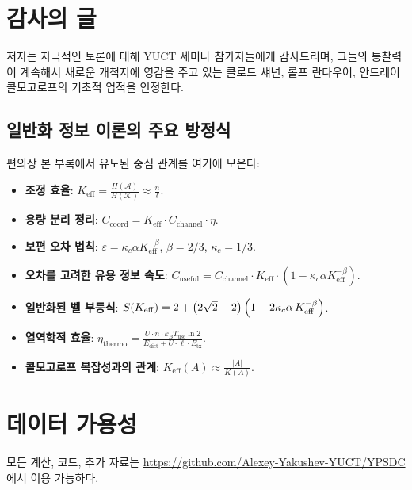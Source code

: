 \documentclass[12pt,a4paper]{article}
\newcommand{\Keff}{K_{\mathrm{eff}}}
\begin{document}
	\section*{감사의 글}
	
	저자는 자극적인 토론에 대해 YUCT 세미나 참가자들에게 감사드리며, 그들의 통찰력이 계속해서 새로운 개척지에 영감을 주고 있는 클로드 섀넌, 롤프 란다우어, 안드레이 콜모고로프의 기초적 업적을 인정한다.
	
	\subsection*{일반화 정보 이론의 주요 방정식}
	편의상 본 부록에서 유도된 중심 관계를 여기에 모은다:
	
	\begin{itemize}
		\item \textbf{조정 효율}: $\Keff = \frac{H(\mathcal{A})}{H(\mathcal{K})} \approx \frac{n}{\ell}$.
		\item \textbf{용량 분리 정리}: $C_{\text{coord}} = \Keff \cdot C_{\text{channel}} \cdot \eta$.
		\item \textbf{보편 오차 법칙}: $\varepsilon = \kappa_c \alpha K_{\mathrm{eff}}^{-\beta}$, $\beta=2/3$, $\kappa_c=1/3$.
		\item \textbf{오차를 고려한 유용 정보 속도}: $C_{\text{useful}} = C_{\text{channel}} \cdot \Keff \cdot (1 - \kappa_c \alpha K_{\mathrm{eff}}^{-\beta})$.
		\item \textbf{일반화된 벨 부등식}: $S(K_{\mathrm{eff}}) = 2 + \bigl(2\sqrt{2}-2\bigr)\,\Bigl(1 - 2\kappa_c\alpha\,K_{\mathrm{eff}}^{-\beta}\Bigr)$.
		\item \textbf{열역학적 효율}: $\eta_{\text{thermo}} = \frac{U \cdot n \cdot k_B T_{\text{use}} \ln 2}{E_{\text{dict}} + U \cdot \ell \cdot E_{\text{tx}}}$.
		\item \textbf{콜모고로프 복잡성과의 관계}: $\Keff(A) \approx \frac{|A|}{K(A)}$.
	\end{itemize}
	
	\section*{데이터 가용성}
	
	모든 계산, 코드, 추가 자료는 \url{https://github.com/Alexey-Yakushev-YUCT/YPSDC}에서 이용 가능하다.
	
\end{document}
